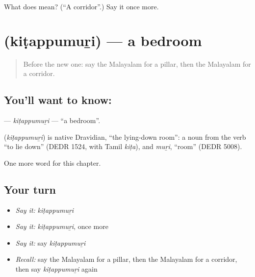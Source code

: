 \begin{tcolorbox}[breakable,colback=teal!4,colframe=teal!35!black,title={Before you move on}]
What does  mean? (\textquotedblleft{}A corridor\textquotedblright{}.) Say it once more.
\end{tcolorbox}
\section[\texorpdfstring{\ml{കിടപ്പുമുറി} (kiṭappumuṟi)}{കിടപ്പുമുറി (kiṭappumuṟi)}]{ (kiṭappumuṟi) — a bedroom}

\label{lesson:ML-C257-kitappumuri}



\begin{quote}
Before the new one: say the Malayalam for a pillar, then the Malayalam for a corridor.
\end{quote}

\subsection*{You'll want to know: }
\textbf{} — \emph{kiṭappumuṟi} — \textquotedblleft{}a bedroom\textquotedblright{}.

\begin{cousinweb}
\textbf{} (\emph{kiṭappumuṟi}) is native Dravidian, \textquotedblleft{}the lying-down room\textquotedblright{}: a noun from the verb \textquotedblleft{}to lie down\textquotedblright{} (DEDR 1524, with Tamil \emph{kiṭa}), and \emph{muṟi}, \textquotedblleft{}room\textquotedblright{} (DEDR 5008).
\end{cousinweb}

\begin{grammarlens}[title={What you've built}]
One more word for this chapter.
\end{grammarlens}

\subsection*{Your turn}
\begin{itemize}
\raggedright
  \item \emph{Say it:} \emph{kiṭappumuṟi}
  \item \emph{Say it:} \emph{kiṭappumuṟi}, once more
  \item \emph{Say it:} say \emph{kiṭappumuṟi}
  \item \emph{Recall:} say the Malayalam for a pillar, then the Malayalam for a corridor, then say \emph{kiṭappumuṟi} again
\end{itemize}

